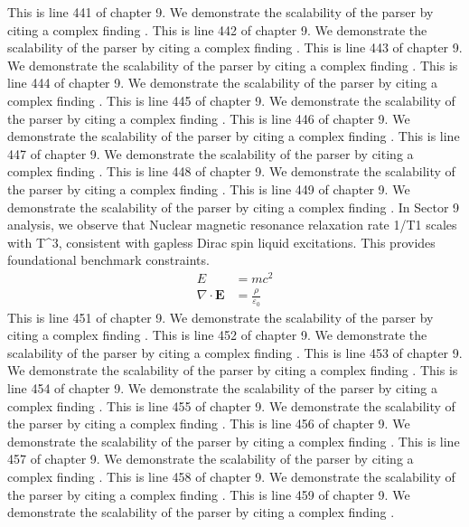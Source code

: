 This is line 441 of chapter 9. We demonstrate the scalability of the parser by citing a complex finding \cite{ref9_441}.
This is line 442 of chapter 9. We demonstrate the scalability of the parser by citing a complex finding \cite{ref9_442}.
This is line 443 of chapter 9. We demonstrate the scalability of the parser by citing a complex finding \cite{ref9_443}.
This is line 444 of chapter 9. We demonstrate the scalability of the parser by citing a complex finding \cite{ref9_444}.
This is line 445 of chapter 9. We demonstrate the scalability of the parser by citing a complex finding \cite{ref9_445}.
This is line 446 of chapter 9. We demonstrate the scalability of the parser by citing a complex finding \cite{ref9_446}.
This is line 447 of chapter 9. We demonstrate the scalability of the parser by citing a complex finding \cite{ref9_447}.
This is line 448 of chapter 9. We demonstrate the scalability of the parser by citing a complex finding \cite{ref9_448}.
This is line 449 of chapter 9. We demonstrate the scalability of the parser by citing a complex finding \cite{ref9_449}.
In Sector 9 analysis, we observe that Nuclear magnetic resonance relaxation rate 1/T1 scales with T^3, consistent with gapless Dirac spin liquid excitations. This provides foundational benchmark constraints.
\begin{align*}
  E &= mc^2 \\
  \nabla \cdot \mathbf{E} &= \frac{\rho}{\varepsilon_0}
\end{align*}
This is line 451 of chapter 9. We demonstrate the scalability of the parser by citing a complex finding \cite{ref9_451}.
This is line 452 of chapter 9. We demonstrate the scalability of the parser by citing a complex finding \cite{ref9_452}.
This is line 453 of chapter 9. We demonstrate the scalability of the parser by citing a complex finding \cite{ref9_453}.
This is line 454 of chapter 9. We demonstrate the scalability of the parser by citing a complex finding \cite{ref9_454}.
This is line 455 of chapter 9. We demonstrate the scalability of the parser by citing a complex finding \cite{ref9_455}.
This is line 456 of chapter 9. We demonstrate the scalability of the parser by citing a complex finding \cite{ref9_456}.
This is line 457 of chapter 9. We demonstrate the scalability of the parser by citing a complex finding \cite{ref9_457}.
This is line 458 of chapter 9. We demonstrate the scalability of the parser by citing a complex finding \cite{ref9_458}.
This is line 459 of chapter 9. We demonstrate the scalability of the parser by citing a complex finding \cite{ref9_459}.
